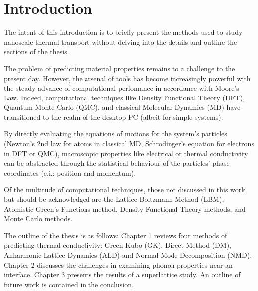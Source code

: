 \chapter{Introduction}

The intent of this introduction is to briefly present the methods used to study nanoscale thermal transport without delving into the details and outline the sections of the thesis.

The problem of predicting material properties remains to a challenge to the present day. However, the arsenal of tools has become increasingly powerful with the steady advance of computational perfomance in accordance with Moore's Law. Indeed, computational techniques like Density Functional Theory (DFT), Quantum Monte Carlo (QMC), and classical Molecular Dynamics (MD) have transitioned to the realm of the desktop PC (albeit for simple systems).

By directly evaluating the equations of motions for the system's particles (Newton's 2nd law for atoms in classical MD, Schrodinger's equation for electrons in DFT or QMC), macroscopic properties like electrical or thermal conductivity can be abstracted through the statistical behaviour of the particles' phase coordinates (e.i.: position and momentum).

Of the multitude of computational techniques, those not discussed in this work but should be acknowledged are the Lattice Boltzmann Method (LBM), \cite{escobar2006multi,smith2006lattice,nabovati2011lattice} Atomistic Green's Functions method, \cite{zhang2007atomistic,hopkins2009extracting,xu2008nonequilibrium,wang2006nonequilibrium}
Density Functional Theory methods, \cite{broido1,PhysRevB.84.085204}
and Monte Carlo methods.\cite{mazumder2001monte, lacroix2005monte, peraud2011efficient}

The outline of the thesis is as follows: Chapter 1 reviews four methods of predicting thermal conductivity: Green-Kubo (GK), Direct Method (DM), Anharmonic Lattice Dynamics (ALD) and Normal Mode Decomposition (NMD). Chapter 2 discusses the challenges in examining phonon properties near an interface. Chapter 3 presents the results of a superlattice study. An outline of future work is contained in the conclusion.

